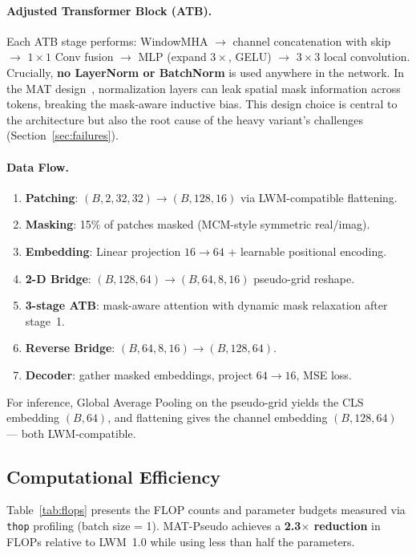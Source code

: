 \documentclass[12pt,a4paper]{article}
\begin{document}
\paragraph{Adjusted Transformer Block (ATB).}
Each ATB stage performs: WindowMHA $\to$ channel concatenation with skip $\to$ $1{\times}1$ Conv fusion $\to$ MLP (expand $3{\times}$, GELU) $\to$ $3{\times}3$ local convolution. Crucially, \textbf{no LayerNorm or BatchNorm} is used anywhere in the network. In the MAT design~\cite{mat}, normalization layers can leak spatial mask information across tokens, breaking the mask-aware inductive bias. This design choice is central to the architecture but also the root cause of the heavy variant's challenges (Section~\ref{sec:failures}).

\paragraph{Data Flow.}
\begin{enumerate}[leftmargin=1.5em]
    \item \textbf{Patching}: $(B, 2, 32, 32) \to (B, 128, 16)$ via LWM-compatible flattening.
    \item \textbf{Masking}: 15\% of patches masked (MCM-style symmetric real/imag).
    \item \textbf{Embedding}: Linear projection $16 \to 64$ + learnable positional encoding.
    \item \textbf{2-D Bridge}: $(B, 128, 64) \to (B, 64, 8, 16)$ pseudo-grid reshape.
    \item \textbf{3-stage ATB}: mask-aware attention with dynamic mask relaxation after stage~1.
    \item \textbf{Reverse Bridge}: $(B, 64, 8, 16) \to (B, 128, 64)$.
    \item \textbf{Decoder}: gather masked embeddings, project $64 \to 16$, MSE loss.
\end{enumerate}

For inference, Global Average Pooling on the pseudo-grid yields the CLS embedding $(B, 64)$, and flattening gives the channel embedding $(B, 128, 64)$ --- both LWM-compatible.

\subsection{Computational Efficiency}\label{subsec:flops}

Table~\ref{tab:flops} presents the FLOP counts and parameter budgets measured via \texttt{thop} profiling (batch size = 1). MAT-Pseudo achieves a \textbf{2.3$\times$ reduction} in FLOPs relative to LWM~1.0 while using less than half the parameters.
\end{document}
